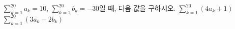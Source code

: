 $\displaystyle\sum_{k=1}^{20}a_k=10$, $\displaystyle\sum_{k=1}^{20}b_k=-30$일 때, 다음 값을 구하시오.
 $\displaystyle\sum_{k=1}^{20}(4a_k+1)$
 $\displaystyle\sum_{k=1}^{20}(3a_k-2b_k)$
